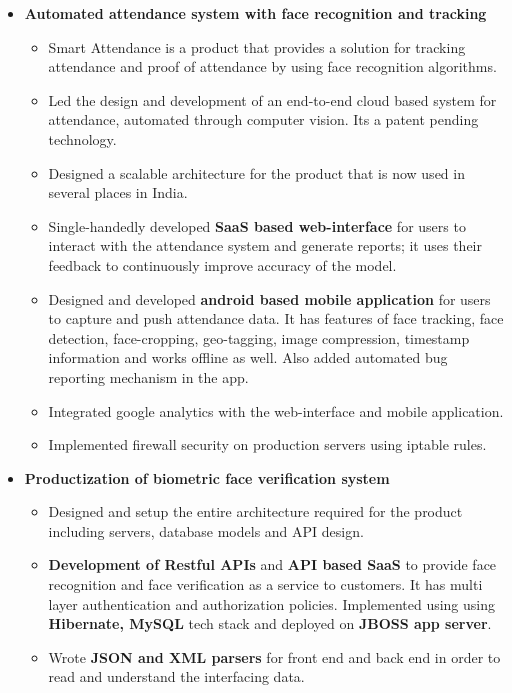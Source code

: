 \documentclass[11pt,letterpaper,sans]{moderncv}        %
\begin{document}
\begin{small}

\begin{itemize}

\item \textbf{Automated attendance system with face recognition and tracking}
\begin{itemize}
\item Smart Attendance is a product that provides a solution for tracking attendance and proof of attendance by using face recognition algorithms.
\vspace{1pt}
\item Led the design and development of an end-to-end cloud based system for attendance, automated through computer vision. Its a patent pending technology.
\vspace{1pt}
\item Designed a scalable architecture for the product that is now used in several places in India.
\vspace{1pt}
\item Single-handedly developed \textbf{SaaS based web-interface} for users to interact with the attendance system and generate reports; it uses their feedback to continuously improve accuracy of the model.
\vspace{1pt}
\item Designed and developed \textbf{android based mobile application} for users to capture and push attendance data. It has features of face tracking, face detection, face-cropping, geo-tagging, image compression, timestamp information and works offline as well. Also added automated bug reporting mechanism in the app.
\vspace{1pt}
\item Integrated google analytics with the web-interface and mobile application.
\vspace{1pt}
\item Implemented firewall security on production servers using iptable rules.
\end{itemize}

\vspace{2pt}

\item \textbf{Productization of biometric face verification system}
\begin{itemize}
\item Designed and setup the entire architecture required for the product including servers, database models and API design.
\vspace{1pt}
\item \textbf{Development of Restful APIs} and \textbf{API based SaaS} to provide face recognition and face verification as a service to customers. It has multi layer authentication and authorization policies. Implemented using using \textbf{Hibernate, MySQL} tech stack and deployed on \textbf{JBOSS app server}.
\vspace{1pt}
\item Wrote \textbf{JSON and XML parsers} for front end and back end in order to read and understand the interfacing data.
\end{itemize}


\end{itemize}
\end{small}
\end{document}
